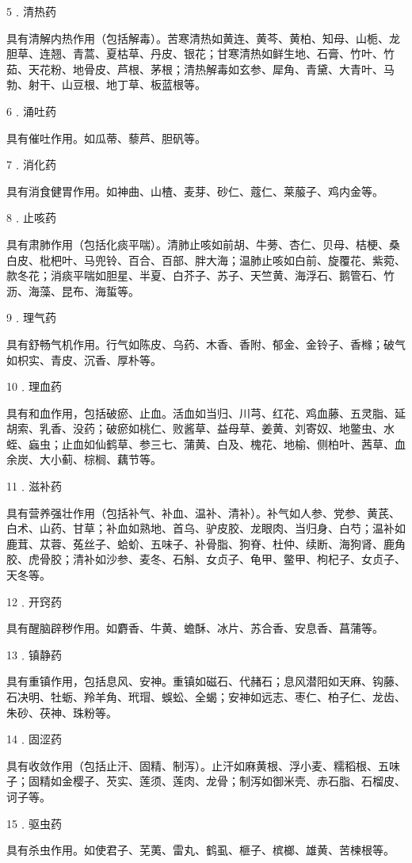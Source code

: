 \documentclass[12pt,UTF8]{ctexbook}
\begin{document}
5﹒清热药

具有清解内热作用（包括解毒）。苦寒清热如黄连、黄芩、黄柏、知母、山栀、龙胆草、连翘、青蒿、夏枯草、丹皮、银花；甘寒清热如鲜生地、石膏、竹叶、竹茹、天花粉、地骨皮、芦根、茅根；清热解毒如玄参、犀角、青黛、大青叶、马勃、射干、山豆根、地丁草、板蓝根等。

6﹒涌吐药

具有催吐作用。如瓜蒂、藜芦、胆矾等。

7﹒消化药

具有消食健胃作用。如神曲、山楂、麦芽、砂仁、蔻仁、莱菔子、鸡内金等。

8﹒止咳药

具有肃肺作用（包括化痰平喘）。清肺止咳如前胡、牛蒡、杏仁、贝母、桔梗、桑白皮、枇杷叶、马兜铃、百合、百部、胖大海；温肺止咳如白前、旋覆花、紫菀、款冬花；消痰平喘如胆星、半夏、白芥子、苏子、天竺黄、海浮石、鹅管石、竹沥、海藻、昆布、海蜇等。

9﹒理气药

具有舒畅气机作用。行气如陈皮、乌药、木香、香附、郁金、金铃子、香橼；破气如枳实、青皮、沉香、厚朴等。

10﹒理血药

具有和血作用，包括破瘀、止血。活血如当归、川芎、红花、鸡血藤、五灵脂、延胡索、乳香、没药；破瘀如桃仁、败酱草、益母草、姜黄、刘寄奴、地鳖虫、水蛭、蝱虫；止血如仙鹤草、参三七、蒲黄、白及、槐花、地榆、侧柏叶、茜草、血余炭、大小蓟、棕榈、藕节等。

11﹒滋补药

具有营养强壮作用（包括补气、补血、温补、清补）。补气如人参、党参、黄芪、白术、山药、甘草；补血如熟地、首乌、驴皮胶、龙眼肉、当归身、白芍；温补如鹿茸、苁蓉、菟丝子、蛤蚧、五味子、补骨脂、狗脊、杜仲、续断、海狗肾、鹿角胶、虎骨胶；清补如沙参、麦冬、石斛、女贞子、龟甲、鳖甲、枸杞子、女贞子、天冬等。

12﹒开窍药

具有醒脑辟秽作用。如麝香、牛黄、蟾酥、冰片、苏合香、安息香、菖蒲等。

13﹒镇静药

具有重镇作用，包括息风、安神。重镇如磁石、代赭石；息风潜阳如天麻、钩藤、石决明、牡蛎、羚羊角、玳瑁、蜈蚣、全蝎；安神如远志、枣仁、柏子仁、龙齿、朱砂、茯神、珠粉等。

14﹒固涩药

具有收敛作用（包括止汗、固精、制泻）。止汗如麻黄根、浮小麦、糯稻根、五味子；固精如金樱子、芡实、莲须、莲肉、龙骨；制泻如御米壳、赤石脂、石榴皮、诃子等。

15﹒驱虫药

具有杀虫作用。如使君子、芜荑、雷丸、鹤虱、榧子、槟榔、雄黄、苦楝根等。
\end{document}
